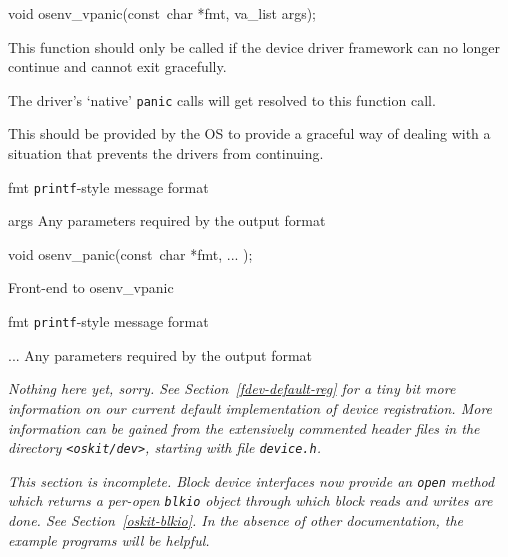 \begin{apisyn}
	\funcproto void osenv_vpanic(const~char *fmt, va_list args);
\end{apisyn}
\drvtoosn
\begin{apidesc}
	This function should only be called if the device driver
	framework can no longer continue and cannot exit gracefully.

	The driver's `native' {\tt panic} calls 
	will get resolved to this function call.

	This should be provided by the OS to provide a graceful way
	of dealing with a situation that prevents the drivers
	from continuing.
\end{apidesc}
\begin{apiparm}
	\item[fmt]
		{\tt printf}-style message format
	\item[args]
		Any parameters required by the output format
\end{apiparm}


\begin{apisyn}
	\funcproto void osenv_panic(const~char *fmt, ... \unskip);
\end{apisyn}
\drvtoosn
\begin{apidesc}

	Front-end to osenv_vpanic
\end{apidesc}
\begin{apiparm}
	\item[fmt]
		{\tt printf}-style message format
	\item[...]
		Any parameters required by the output format
\end{apiparm}




\emph{Nothing here yet, sorry.  See Section~\ref{fdev-default-reg} for
a tiny bit more information on our current default implementation of
device registration.  More information can be gained from the
extensively commented header files in the directory
\texttt{<oskit/dev>}, starting with file \texttt{device.h}.
}



\emph{This section is incomplete.  Block device interfaces now
	provide an {\tt open} method which returns a per-open
	{\tt blkio} object through which block reads and writes are
	done.  See Section~\ref{oskit-blkio}.  In the absence of other
	documentation, the example programs will be helpful.
}

